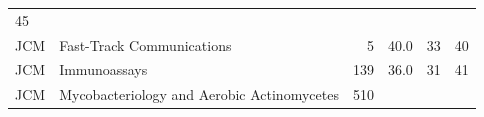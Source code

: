 \documentclass[11pt,]{article}
\begin{document}
\begin{longtable}[]{@{}llrrrr@{}}
\begin{minipage}[t]{0.11\columnwidth}
45\strut
\end{minipage}\tabularnewline
\begin{minipage}[t]{0.06\columnwidth}\raggedright\strut
JCM\strut
\end{minipage} & \begin{minipage}[t]{0.43\columnwidth}\raggedright\strut
Fast-Track Communications\strut
\end{minipage} & \begin{minipage}[t]{0.04\columnwidth}\raggedleft\strut
5\strut
\end{minipage} & \begin{minipage}[t]{0.08\columnwidth}\raggedleft\strut
40.0\strut
\end{minipage} & \begin{minipage}[t]{0.11\columnwidth}\raggedleft\strut
33\strut
\end{minipage} & \begin{minipage}[t]{0.11\columnwidth}\raggedleft\strut
40\strut
\end{minipage}\tabularnewline
\begin{minipage}[t]{0.06\columnwidth}\raggedright\strut
JCM\strut
\end{minipage} & \begin{minipage}[t]{0.43\columnwidth}\raggedright\strut
Immunoassays\strut
\end{minipage} & \begin{minipage}[t]{0.04\columnwidth}\raggedleft\strut
139\strut
\end{minipage} & \begin{minipage}[t]{0.08\columnwidth}\raggedleft\strut
36.0\strut
\end{minipage} & \begin{minipage}[t]{0.11\columnwidth}\raggedleft\strut
31\strut
\end{minipage} & \begin{minipage}[t]{0.11\columnwidth}\raggedleft\strut
41\strut
\end{minipage}\tabularnewline
\begin{minipage}[t]{0.06\columnwidth}\raggedright\strut
JCM\strut
\end{minipage} & \begin{minipage}[t]{0.43\columnwidth}\raggedright\strut
Mycobacteriology and Aerobic Actinomycetes\strut
\end{minipage} & \begin{minipage}[t]{0.04\columnwidth}\raggedleft\strut
510\strut
\end{minipage} & \begin{minipage}[t]{0.08\columnwidth}\raggedleft\strut

\end{minipage}
\end{longtable}
\end{document}
